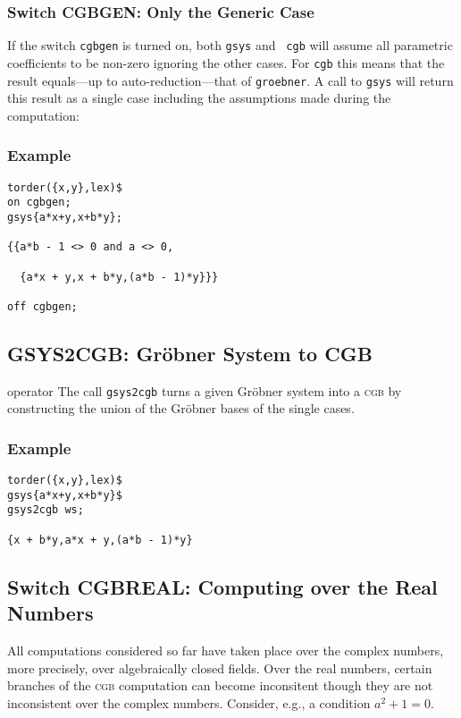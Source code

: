 \subsubsection{Switch CGBGEN: Only the Generic Case}
If the switch \texttt{cgbgen} is turned on, both \texttt{gsys} and {\tt
cgb} will assume all parametric coefficients to be non-zero ignoring
the other cases. For \texttt{cgb} this means that the result equals---up
to auto-reduction---that of \texttt{groebner}. A call to \texttt{gsys} will
return this result as a single case including the assumptions made
during the computation:
%
\subsubsection*{Example}
\begin{verbatim}
torder({x,y},lex)$
on cgbgen;
gsys{a*x+y,x+b*y};

{{a*b - 1 <> 0 and a <> 0,

  {a*x + y,x + b*y,(a*b - 1)*y}}}

off cgbgen;
\end{verbatim}
%
\subsection{GSYS2CGB: Gr\"obner System to CGB}
 {operator}
The call \texttt{gsys2cgb} turns a given Gr\"obner system into a \textsc{cgb}
by constructing the union of the Gr\"obner bases of the single
cases.
%
\subsubsection*{Example}
\begin{verbatim}
torder({x,y},lex)$
gsys{a*x+y,x+b*y}$
gsys2cgb ws;

{x + b*y,a*x + y,(a*b - 1)*y}
\end{verbatim}
%
\subsection{Switch CGBREAL: Computing over the Real Numbers}
\label{cgbreal}
All computations considered so far have taken place over the complex
numbers, more precisely, over algebraically closed fields. Over the
real numbers, certain branches of the \textsc{cgb} computation can become
inconsitent though they are not inconsistent over the complex numbers.
Consider, e.g., a condition $a^2+1=0$.

